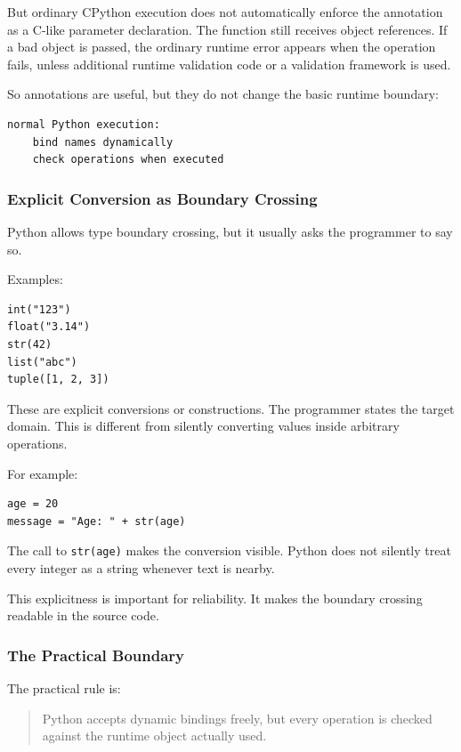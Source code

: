 But ordinary CPython execution does not automatically enforce the annotation as a C-like parameter declaration. The function still receives object references. If a bad object is passed, the ordinary runtime error appears when the operation fails, unless additional runtime validation code or a validation framework is used.

So annotations are useful, but they do not change the basic runtime boundary:

\begin{verbatim}
normal Python execution:
    bind names dynamically
    check operations when executed
\end{verbatim}

\subsubsection*{Explicit Conversion as Boundary Crossing}

Python allows type boundary crossing, but it usually asks the programmer to say so.

Examples:

\begin{verbatim}
int("123")
float("3.14")
str(42)
list("abc")
tuple([1, 2, 3])
\end{verbatim}

These are explicit conversions or constructions. The programmer states the target domain. This is different from silently converting values inside arbitrary operations.

For example:

\begin{verbatim}
age = 20
message = "Age: " + str(age)
\end{verbatim}

The call to \texttt{str(age)} makes the conversion visible. Python does not silently treat every integer as a string whenever text is nearby.

This explicitness is important for reliability. It makes the boundary crossing readable in the source code.

\subsubsection*{The Practical Boundary}

The practical rule is:

\begin{quote}
Python accepts dynamic bindings freely, but every operation is checked against the runtime object actually used.
\end{quote}

